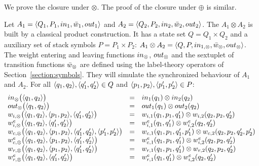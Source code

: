 %
%
We prove the closure under $\otimes$. 
The proof of the closure under $\oplus$ is similar.

Let $A_1 = \< Q_1, P_1, \init_1, \bar\wei_1, \final_1 >$
and $A_2 = \< Q_2, P_2, \init_2, \bar\wei_2, \final_2 >$.
The \SWVPA $A_1 \otimes A_2$ is built by a 
classical product construction.
%
It has a state set $Q = Q_1 \times Q_2$
and a auxiliary set of stack symbols $P = P_1 \times P_2$:
$A_1 \otimes A_2 = \< Q, P, \init_{1, \otimes}, 
         \bar\wei_{\otimes}, \final_{\otimes} >$.
The weight entering and leaving functions         
$\init_{\otimes}$, $\final_{\otimes}$
and the sextuplet of transition functions $\bar\wei_{\otimes}$
are defined 
using the label-theory operators of Section~\ref{section:symbols}.
They will simulate the synchronized behaviour of $A_1$ and $A_2$.
%
For all $\< q_1, q_2>, \< q'_1, q'_2> \in Q$ 
and $\< p_1, p_2>, \< p'_1, p'_2> \in P$:
\[
\begin{array}{lcl}
\init_{\otimes}\bigl(\< q_1, q_2>\bigr) & = & \init_{1}(q_1) \otimes \init_{2}(q_2)\\
\final_{\otimes}\bigl(\< q_1, q_2>\bigr) & = & \final_{1}(q_1) \otimes \final_{2}(q_2)\\
%
\wei_{\mathsf{i}, \otimes}\bigl(\< q_1, q_2>, \<p_1, p_2>, \<q'_1, q'_2>\bigr) & = &
\wei_{\mathsf{i}, 1}(q_1, p_1, q'_1) \otimes \wei_{\mathsf{i}, 2}(q_2, p_2, q'_2)\\
%
\weie[\mathsf{i}, \otimes]\bigl(\< q_1, q_2>, \<q'_1, q'_2>\bigr) & = &
\weie[\mathsf{i}, 1](q_1, q'_1) \otimes \weie[\mathsf{i}, 2](q_2, q'_2)\\
%
\wei_{\mathsf{c}, \otimes}\bigl(\< q_1, q_2>, \<p_1, p_2>, \<q'_1, q'_2>, \<p'_1, p'_2>\bigr) & = &
\wei_{\mathsf{c}, 1}(q_1, p_1, q'_1, p'_1) \otimes \wei_{\mathsf{c}, 2}(q_2, p_2, q'_2, p'_2)\\
%
\weie[\mathsf{c}, \otimes]\bigl(\< q_1, q_2>, \<p_1, p_2>, \<q'_1, q'_2>\bigr) & = &
\weie[\mathsf{c}, 1](q_1, p_1, q'_1) \otimes \weie[\mathsf{i}, 2](q_2, p_2, q'_2)\\
%
\wei_{\mathsf{r}, \otimes}\bigl(\< q_1, q_2>, \<p_1, p_2>, \<q'_1, q'_2>\bigr) & = &
\wei_{\mathsf{r}, 1}(q_1, p_1, q'_1) \otimes \wei_{\mathsf{r}, 2}(q_2, p_2, q'_2)\\
%
\weie[\mathsf{r}, \otimes]\bigl(\< q_1, q_2>, \<q'_1, q'_2>\bigr) & = &
\weie[\mathsf{r}, 1](q_1, q'_1) \otimes \weie[\mathsf{i}, 2](q_2, q'_2)\\
\end{array}
\]






